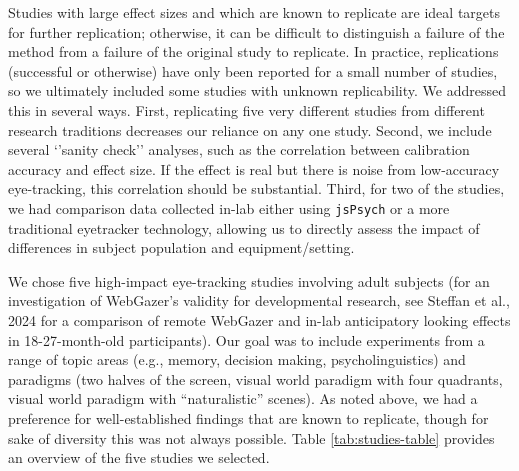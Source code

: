 \documentclass[
  man,floatsintext]{apa6}
\begin{document}
Studies with large effect sizes and which are known to replicate are ideal targets for further replication; otherwise, it can be difficult to distinguish a failure of the method from a failure of the original study to replicate. In practice, replications (successful or otherwise) have only been reported for a small number of studies, so we ultimately included some studies with unknown replicability. We addressed this in several ways. First, replicating five very different studies from different research traditions decreases our reliance on any one study. Second, we include several `'sanity check'' analyses, such as the correlation between calibration accuracy and effect size. If the effect is real but there is noise from low-accuracy eye-tracking, this correlation should be substantial. Third, for two of the studies, we had comparison data collected in-lab either using \texttt{jsPsych} or a more traditional eyetracker technology, allowing us to directly assess the impact of differences in subject population and equipment/setting.

We chose five high-impact eye-tracking studies involving adult subjects (for an investigation of WebGazer's validity for developmental research, see Steffan et al., 2024 for a comparison of remote WebGazer and in-lab anticipatory looking effects in 18-27-month-old participants). Our goal was to include experiments from a range of topic areas (e.g., memory, decision making, psycholinguistics) and paradigms (two halves of the screen, visual world paradigm with four quadrants, visual world paradigm with ``naturalistic'' scenes). As noted above, we had a preference for well-established findings that are known to replicate, though for sake of diversity this was not always possible. Table \ref{tab:studies-table} provides an overview of the five studies we selected.
\end{document}
